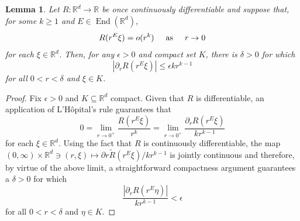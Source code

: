 \documentclass[11pt]{article}
\newtheorem{lemma}[theorem]{Lemma}
\newcommand\End{\operatorname{End}} %
\begin{document}
\begin{lemma}\label{lem:LHopital_and_oP}
Let $R:\mathbb{R}^d\to\mathbb{R}$ be once continuously differentiable and suppose that, for some $k\geq 1$ and $E\in \End(\mathbb{R}^d)$, 
\begin{equation*}
    R(r^E\xi)=o(r^k)\hspace{.5cm}\mbox{as}\hspace{.5cm}r\to 0
\end{equation*}
for each $\xi\in\mathbb{R}^d$.
Then, for any $\epsilon>0$ and compact set $K$, there is $\delta>0$ for which
\begin{equation*}
    |\partial_r R(r^E\xi)|\leq \epsilon k r^{k-1}
\end{equation*}
for all $0<r<\delta$ and $\xi\in K$.
\end{lemma}
\begin{proof}
Fix $\epsilon>0$ and $K\subseteq\mathbb{R}^d$ compact. Given that $R$ is differentiable, an application of L'H\^{o}pital's rule guarantees that
\begin{equation*}
    0=\lim_{r\to 0^+}\frac{R(r^E\xi)}{r^k}=\lim_{r\to 0^+}\frac{\partial_r R(r^E\xi)}{kr^{k-1}}
\end{equation*}
for each $\xi\in \mathbb{R}^d$. Using the fact that $R$ is continuously differentiable, the map $(0,\infty)\times \mathbb{R}^d\ni (r,\xi) \mapsto \partial r \widetilde{R}(r^E\xi)/kr^{k-1}$ is jointly continuous and therefore, by virtue of the above limit, a straightforward compactness argument guarantees a $\delta>0$ for which
\begin{equation*}
    \frac{|\partial_r R(r^E\eta)|}{kr^{k-1}}<\epsilon
\end{equation*}
for all $0<r<\delta$ and $\eta\in K$. 
\end{proof}
\end{document}
